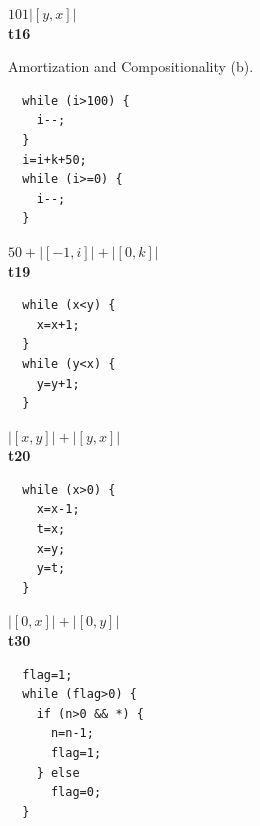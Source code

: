 \documentclass[nocopyrightspace,preprint]{sigplanconf}
\begin{document}
{\begin{figure}[t!]
\begin{minipage}[b]{\progwidth}
\begin{center}
$101|[y,x]|$
\\[.7\baselineskip]
      {\bf t16}
    \end{center}
  \end{minipage}


   \caption{Amortization and Compositionality (b).}
  \label{fig:cat1b}
\end{figure}


\begin{figure}[t!]
 \setlength{\progwidth}{.24\linewidth}
  \centering

  \begin{minipage}[b]{\progwidth}
    \begin{center}
   \begin{lstlisting}
  while (i>100) {
    i--;
  }
  i=i+k+50;
  while (i>=0) {
    i--;
  }
   \end{lstlisting}

$50 + |[-1,i]| + |[0,k]|$
\\[.7\baselineskip]
      {\bf t19}
    \end{center}
  \end{minipage}%
%
%
%
  \begin{minipage}[b]{\progwidth}
    \begin{center}
   \begin{lstlisting}
  while (x<y) {
    x=x+1;
  }
  while (y<x) {
    y=y+1;
  }
   \end{lstlisting}

$|[x,y]|+|[y,x]|$
\\[.7\baselineskip]
      {\bf t20}
    \end{center}
  \end{minipage}%
%
%
  \begin{minipage}[b]{\progwidth}
    \begin{center}
   \begin{lstlisting}
  while (x>0) {
    x=x-1;
    t=x;
    x=y;
    y=t;
  }
   \end{lstlisting}

$|[0,x]|+|[0,y]|$
\\[.7\baselineskip]
      {\bf t30}
    \end{center}
  \end{minipage}
%
%
  \begin{minipage}[b]{\progwidth}
    \begin{center}
   \begin{lstlisting}
  flag=1;
  while (flag>0) {
    if (n>0 && *) {
      n=n-1;
      flag=1;
    } else
      flag=0;
  }
   \end{lstlisting}


\end{center}
\end{minipage}
\end{figure}}
\end{document}
